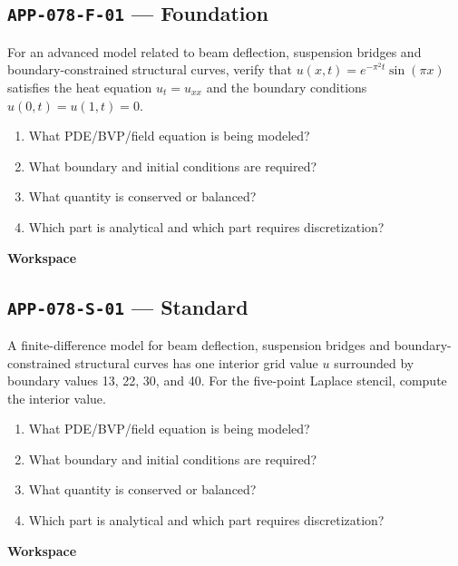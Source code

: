 \documentclass[11pt]{book}
\newcommand{\pid}[1]{\texttt{#1}}
\newcommand{\workspace}{\par\vspace{0.7in}\hrulefill\par\vspace{0.55in}\hrulefill\par}
\begin{document}
\subsection*{\pid{APP-078-F-01} — Foundation}
\begin{problembox}
For an advanced model related to beam deflection, suspension bridges and boundary-constrained structural curves, verify that $u(x,t)=e^{-\pi^2t}\sin(\pi x)$ satisfies the heat equation $u_t=u_{xx}$ and the boundary conditions $u(0,t)=u(1,t)=0$.
\end{problembox}
\begin{promptbox}\begin{enumerate}
\item What PDE/BVP/field equation is being modeled?
\item What boundary and initial conditions are required?
\item What quantity is conserved or balanced?
\item Which part is analytical and which part requires discretization?
\end{enumerate}\end{promptbox}
\textbf{Workspace}\workspace
{}
\subsection*{\pid{APP-078-S-01} — Standard}
\begin{problembox}
A finite-difference model for beam deflection, suspension bridges and boundary-constrained structural curves has one interior grid value $u$ surrounded by boundary values 13, 22, 30, and 40. For the five-point Laplace stencil, compute the interior value.
\end{problembox}
\begin{promptbox}\begin{enumerate}
\item What PDE/BVP/field equation is being modeled?
\item What boundary and initial conditions are required?
\item What quantity is conserved or balanced?
\item Which part is analytical and which part requires discretization?
\end{enumerate}\end{promptbox}
\textbf{Workspace}\workspace
{}
\end{document}
